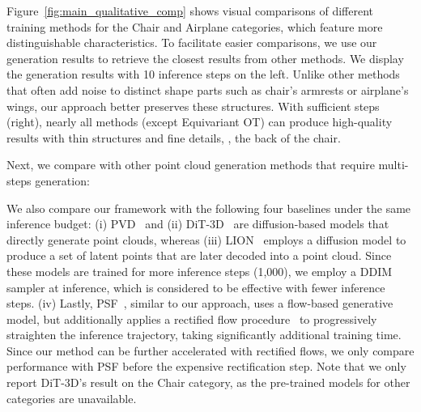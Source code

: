 Figure~\ref{fig:main_qualitative_comp} shows visual comparisons of different training methods for the Chair and Airplane categories, which feature more distinguishable characteristics.
%
To facilitate easier comparisons, we use our generation results to retrieve the closest results from other methods.
%
We display the generation results with 10 inference steps on the left.
%
Unlike other methods that often add noise to distinct shape parts such as chair's armrests or airplane's wings, our approach better preserves these structures.
%
With sufficient steps (right), nearly all methods (except Equivariant OT) can produce high-quality results with thin structures and fine details, \eg, the back of the chair.




Next, we compare with other point cloud generation methods that require multi-steps generation:



We also compare our framework with the following four baselines under the same inference budget: 
%
(i) PVD~\cite{zhou2021pvd} and (ii) DiT-3D~\cite{mo2023dit3d} are diffusion-based models that directly generate point clouds, whereas 
(iii) LION~\cite{zeng2022lion} employs a diffusion model to produce a set of latent points that are later decoded into a point cloud.
%
%
%
%
Since these models are trained for more inference steps (1,000), we employ a DDIM sampler at inference, which is considered to be effective with fewer inference steps.
%
(iv) Lastly, PSF~\cite{wu2023psf}, similar to our approach, uses a flow-based generative model, but additionally applies a rectified flow procedure~\cite{liu2022flow} to progressively straighten the inference trajectory, taking significantly additional training time.
%
Since our method can be further accelerated with rectified flows, we only compare performance with PSF before the expensive rectification step.
%
Note that we only report DiT-3D's result on the Chair category, as the pre-trained models for other categories are unavailable.

